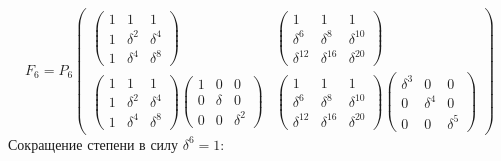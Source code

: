 \[
    F_6
    = P_6
    \begin{pmatrix}
        \begin{pmatrix}
            1 & 1        & 1        \\
            1 & \delta^2 & \delta^4 \\
            1 & \delta^4 & \delta^8
        \end{pmatrix}
        &
        \begin{pmatrix}
            1           & 1           & 1           \\
            \delta^6    & \delta^8    & \delta^{10} \\
            \delta^{12} & \delta^{16} & \delta^{20}
        \end{pmatrix}
        \\
        \begin{pmatrix}
            1 & 1        & 1        \\
            1 & \delta^2 & \delta^4 \\
            1 & \delta^4 & \delta^8
        \end{pmatrix}
        \begin{pmatrix}
            1 & 0      & 0        \\
            0 & \delta & 0        \\
            0 & 0      & \delta^2
        \end{pmatrix}
        &
        \begin{pmatrix}
            1           & 1           & 1           \\
            \delta^6    & \delta^8    & \delta^{10} \\
            \delta^{12} & \delta^{16} & \delta^{20}
        \end{pmatrix}
        \begin{pmatrix}
            \delta^3 & 0        & 0        \\
            0        & \delta^4 & 0        \\
            0        & 0        & \delta^5
        \end{pmatrix}
    \end{pmatrix}
\]
Сокращение степени в силу $\delta^6 = 1$:
